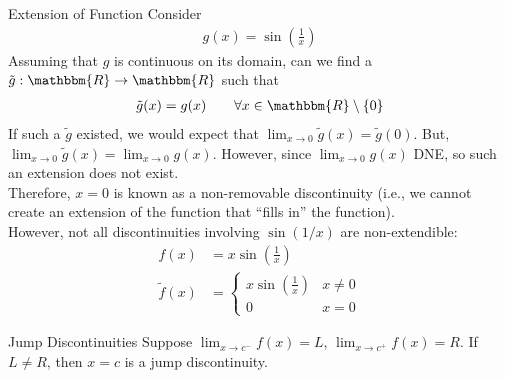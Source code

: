 \documentclass[10pt]{extarticle}
\newcommand{\R}{\mathbbm{R}}
\begin{document}
  \begin{problem}{Extension of Function}
    Consider
    \begin{align*}
      g(x) = \sin\left(\frac{1}{x}\right) \tag*{$x\neq 0$}
    \end{align*}
    \tcblower
    Assuming that $g$ is continuous on its domain, can we find a $\tilde{g}: \R\rightarrow\R$ such that
    \begin{align*}
      \tilde{g}(x) = g(x) \tag*{$\forall x\in\R\setminus\{0\}$}
    \end{align*}
    If such a $\tilde{g}$ existed, we would expect that $\lim_{x\rightarrow 0}\tilde{g}(x) = \tilde{g}(0)$. But, $\lim_{x\rightarrow 0}\tilde{g}(x) = \lim_{x\rightarrow 0}g(x)$. However, since $\lim_{x\rightarrow 0}g(x)$ DNE, so such an extension does not exist.\\

    Therefore, $x = 0$ is known as a non-removable discontinuity (i.e., we cannot create an extension of the function that ``fills in'' the function).\\

    However, not all discontinuities involving $\sin(1/x)$ are non-extendible:
    \begin{align*}
      f(x) &= x\sin\left(\frac{1}{x}\right)\\
      \tilde{f}(x) &= \begin{cases}
        x\sin\left(\frac{1}{x}\right) & x\neq 0\\
        0 & x = 0
      \end{cases}
    \end{align*}
  \end{problem}
  \begin{problem}{Jump Discontinuities}
    Suppose $\lim_{x\rightarrow c^-}f(x) = L$, $\lim_{x\rightarrow c^+} f(x) = R$. If $L \neq R$, then $x = c$ is a jump discontinuity.
  \end{problem}
\end{document}
